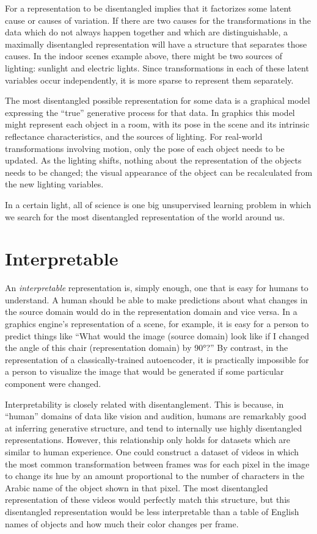 \documentclass[12pt,twoside]{mitthesis}
\begin{document}
For a representation to be disentangled implies that it factorizes some
latent cause or causes of variation. If there are two causes for the
transformations in the data which do not always happen together and
which are distinguishable, a maximally disentangled representation will
have a structure that separates those causes. In the indoor scenes
example above, there might be two sources of lighting: sunlight and
electric lights. Since transformations in each of these latent variables
occur independently, it is more sparse to represent them separately.

The most disentangled possible representation for some data is a
graphical model expressing the ``true'' generative process for that
data. In graphics this model might represent each object in a room, with
its pose in the scene and its intrinsic reflectance characteristics, and
the sources of lighting. For real-world transformations involving
motion, only the pose of each object needs to be updated. As the
lighting shifts, nothing about the representation of the objects needs
to be changed; the visual appearance of the object can be recalculated
from the new lighting variables.

In a certain light, all of science is one big unsupervised learning
problem in which we search for the most disentangled representation of
the world around us.

\section{Interpretable}\label{interpretable}

An \emph{interpretable} representation is, simply enough, one that is
easy for humans to understand. A human should be able to make
predictions about what changes in the source domain would do in the
representation domain and vice versa. In a graphics engine's
representation of a scene, for example, it is easy for a person to
predict things like ``What would the image (source domain) look like if
I changed the angle of this chair (representation domain) by 90°?'' By
contrast, in the representation of a classically-trained autoencoder, it
is practically impossible for a person to visualize the image that would
be generated if some particular component were changed.

Interpretability is closely related with disentanglement. This is
because, in ``human'' domains of data like vision and audition, humans
are remarkably good at inferring generative structure, and tend to
internally use highly disentangled representations. However, this
relationship only holds for datasets which are similar to human
experience. One could construct a dataset of videos in which the most
common transformation between frames was for each pixel in the image to
change its hue by an amount proportional to the number of characters in
the Arabic name of the object shown in that pixel. The most disentangled
representation of these videos would perfectly match this structure, but
this disentangled representation would be less interpretable than a
table of English names of objects and how much their color changes per
frame.
\end{document}
